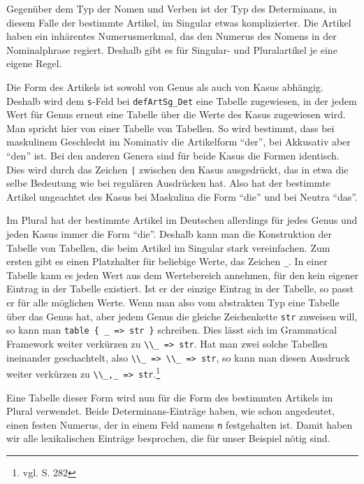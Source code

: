 Gegenüber dem Typ der Nomen und Verben ist der Typ des Determinans, in diesem Falle der bestimmte Artikel, im Singular etwas komplizierter. Die Artikel haben ein inhärentes Numerusmerkmal, das den Numerus des Nomens in der Nominalphrase regiert. Deshalb gibt es für Singular- und Pluralartikel je eine eigene Regel. \par 
Die Form des Artikels ist sowohl von Genus als auch von Kasus abhängig. Deshalb wird dem \texttt{s}-Feld bei \texttt{defArtSg\_Det} eine Tabelle zugewiesen, in der jedem Wert für Genus erneut eine Tabelle über die Werte des Kasus zugewiesen wird. Man spricht hier von einer Tabelle von Tabellen. So wird bestimmt, dass bei maskulinem Geschlecht im Nominativ die Artikelform "`der"', bei Akkusativ aber "`den"' ist. Bei den anderen Genera sind für beide Kasus die Formen identisch. Dies wird durch das Zeichen \texttt{|} zwischen den Kasus ausgedrückt, das in etwa die selbe Bedeutung wie bei regulären Ausdrücken hat. Also hat der bestimmte Artikel ungeachtet des Kasus bei Maskulina die Form "`die"' und bei Neutra "`das"'. \par
Im Plural hat der bestimmte Artikel im Deutschen allerdings für jedes Genus und jeden Kasus immer die Form "`die"'. Deshalb kann man die Konstruktion der Tabelle von Tabellen, die beim Artikel im Singular stark vereinfachen. Zum ersten gibt es einen Platzhalter für beliebige Werte, das Zeichen \texttt{\_}. In einer Tabelle kann es jeden Wert aus dem Wertebereich annehmen, für den kein eigener Eintrag in der Tabelle existiert. Ist er der einzige Eintrag in der Tabelle, so passt er für alle möglichen Werte. Wenn man also vom abstrakten Typ eine Tabelle über das Genus hat, aber jedem Genus die gleiche Zeichenkette \texttt{str} zuweisen will, so kann man \texttt{table \{ \_ => str \}} schreiben. Dies lässt sich im Grammatical Framework weiter verkürzen zu \mbox{\texttt{\textbackslash{}\textbackslash{}\_ => str}}. Hat man zwei solche Tabellen ineinander geschachtelt, also \mbox{\texttt{\textbackslash{}\textbackslash{}\_ => \textbackslash{}\textbackslash{}\_ => str}}, so kann man diesen Ausdruck weiter verkürzen zu \mbox{\texttt{\textbackslash{}\textbackslash{}\_,\_ => str}}.\footnote{vgl. \cite{RANTA2011} S. 282} \par
Eine Tabelle dieser Form wird nun für die Form des bestimmten Artikels im Plural verwendet. Beide Determinans-Einträge haben, wie schon angedeutet, einen festen Numerus, der in einem Feld namens \texttt{n} festgehalten ist. Damit haben wir alle lexikalischen Einträge besprochen, die für unser Beispiel nötig sind. \par
